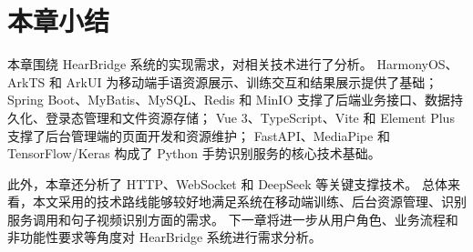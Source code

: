 
\section{本章小结}

本章围绕 HearBridge 系统的实现需求，对相关技术进行了分析。
HarmonyOS、ArkTS 和 ArkUI 为移动端手语资源展示、训练交互和结果展示提供了基础；
Spring Boot、MyBatis、MySQL、Redis 和 MinIO 支撑了后端业务接口、数据持久化、登录态管理和文件资源存储；
Vue 3、TypeScript、Vite 和 Element Plus 支撑了后台管理端的页面开发和资源维护；
FastAPI、MediaPipe 和 TensorFlow/Keras 构成了 Python 手势识别服务的核心技术基础。

此外，本章还分析了 HTTP、WebSocket 和 DeepSeek 等关键支撑技术。
总体来看，本文采用的技术路线能够较好地满足系统在移动端训练、后台资源管理、识别服务调用和句子视频识别方面的需求。
下一章将进一步从用户角色、业务流程和非功能性要求等角度对 HearBridge 系统进行需求分析。
